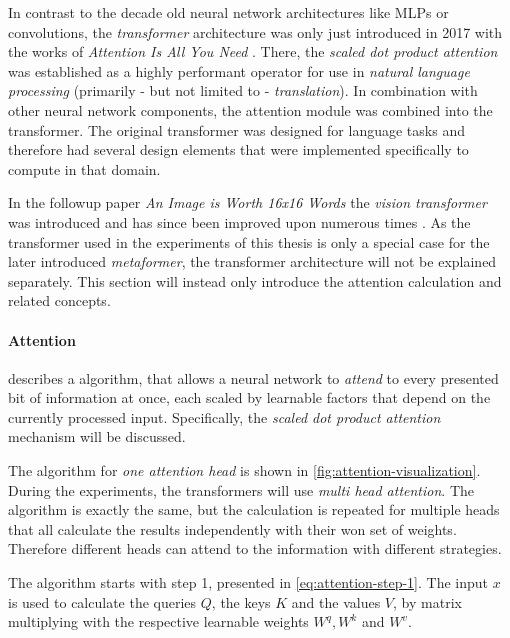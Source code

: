 In contrast to the decade old neural network architectures like MLPs or convolutions, the \emph{transformer} architecture was only just introduced in 2017 with the works of \emph{Attention Is All You Need} \cite{attentionIsAllYouNeed}.
There, the \emph{scaled dot product attention} was established as a highly performant operator for use in \emph{natural language processing} (primarily - but not limited to - \emph{translation}).
In combination with other neural network components, the attention module was combined into the transformer.
The original transformer was designed for language tasks and therefore had several design elements that were implemented specifically to compute in that domain.

In the followup paper \emph{An Image is Worth 16x16 Words} \cite{imageWorth16x16} the \emph{vision transformer} was introduced and has since been improved upon numerous times \cite{swinTransformerPaper}.
As the transformer used in the experiments of this thesis is only a special case for the later introduced \emph{metaformer}, the transformer architecture will not be explained separately. 
This section will instead only introduce the attention calculation and related concepts.

\FloatBarrier
\paragraph{Attention} describes a algorithm, that allows a neural network to \emph{attend} to every presented bit of information at once, each scaled by learnable factors that depend on the currently processed input.
Specifically, the \emph{scaled dot product attention} mechanism will be discussed.

The algorithm for \emph{one attention head} is shown in \autoref{fig:attention-visualization}.
During the experiments, the transformers will use \emph{multi head attention}. 
The algorithm is exactly the same, but the calculation is repeated for multiple \glqq heads\grqq{} that all calculate the results independently with their won set of weights. 
Therefore different heads can attend to the information with different strategies.

The algorithm starts with step 1, presented in \autoref{eq:attention-step-1}.
The input $x$ is used to calculate the queries $Q$, the keys $K$ and the values $V$, by matrix multiplying with the respective learnable weights $W^q, W^k$ and $W^v$.

